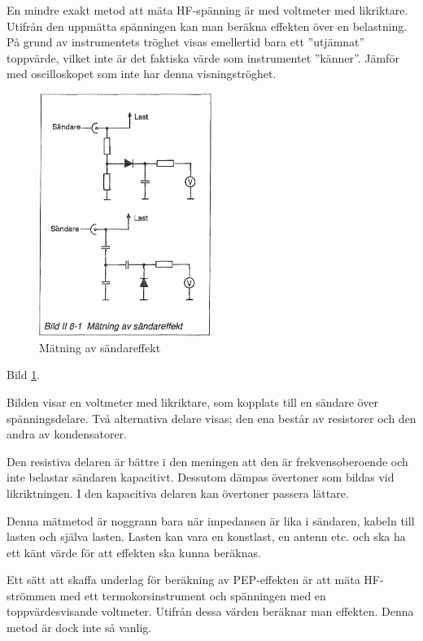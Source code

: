 En mindre exakt metod att mäta HF-spänning är med voltmeter med
likriktare.  Utifrån den uppmätta spänningen kan man beräkna effekten
över en belastning. På grund av instrumentets tröghet visas emellertid
bara ett ''utjämnat'' toppvärde, vilket inte är det faktiska värde som
instrumentet ''känner''. Jämför med oscilloskopet som inte har denna
visningströghet.

\begin{figure}
  \includegraphics[width=0.5\textwidth]{images/bild_2_8-01}
  \caption{Mätning av sändareffekt}
  \label{fig:bildII8-1}
\end{figure}

Bild \ref{fig:bildII8-1}.

Bilden visar en voltmeter med likriktare, som kopplats till en sändare
över spänningsdelare. Två alternativa delare visas; den ena består av
resistorer och den andra av kondensatorer.

Den resistiva delaren är bättre i den meningen att den är
frekvensoberoende och inte belastar sändaren kapacitivt. Dessutom
dämpas övertoner som bildas vid likriktningen. I den kapacitiva
delaren kan övertoner passera lättare.

Denna mätmetod är noggrann bara när impedansen är lika i sändaren,
kabeln till lasten och själva lasten. Lasten kan vara en konstlast, en
antenn etc. och ska ha ett känt värde för att effekten ska kunna
beräknas.

Ett sätt att skaffa underlag för beräkning av PEP-effekten är att mäta
HF-strömmen med ett termokorsinstrument och spänningen med en
toppvärdesvisande voltmeter. Utifrån dessa värden beräknar man
effekten. Denna metod är dock inte så vanlig.


